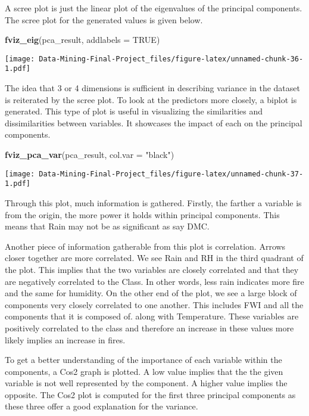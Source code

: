 \documentclass[
]{article}
\newenvironment{Shaded}{\begin{snugshade}}{\end{snugshade}}
\newcommand{\AttributeTok}[1]{\textcolor[rgb]{0.13,0.29,0.53}{#1}}
\newcommand{\ConstantTok}[1]{\textcolor[rgb]{0.56,0.35,0.01}{#1}}
\newcommand{\FunctionTok}[1]{\textcolor[rgb]{0.13,0.29,0.53}{\textbf{#1}}}
\newcommand{\NormalTok}[1]{#1}
\newcommand{\StringTok}[1]{\textcolor[rgb]{0.31,0.60,0.02}{#1}}
\begin{document}
A scree plot is just the linear plot of the eigenvalues of the principal
components. The scree plot for the generated values is given below.

\begin{Shaded}
\begin{Highlighting}[]
\FunctionTok{fviz\_eig}\NormalTok{(pca\_result, }\AttributeTok{addlabels =} \ConstantTok{TRUE}\NormalTok{)}
\end{Highlighting}
\end{Shaded}

\texttt{[image: Data-Mining-Final-Project\_files/figure-latex/unnamed-chunk-36-1.pdf]}

The idea that 3 or 4 dimensions is sufficient in describing variance in
the dataset is reiterated by the scree plot. To look at the predictors
more closely, a biplot is generated. This type of plot is useful in
visualizing the similarities and dissimilarities between variables. It
showcases the impact of each on the principal components.

\begin{Shaded}
\begin{Highlighting}[]
\FunctionTok{fviz\_pca\_var}\NormalTok{(pca\_result, }\AttributeTok{col.var =} \StringTok{"black"}\NormalTok{)}
\end{Highlighting}
\end{Shaded}

\texttt{[image: Data-Mining-Final-Project\_files/figure-latex/unnamed-chunk-37-1.pdf]}

Through this plot, much information is gathered. Firstly, the farther a
variable is from the origin, the more power it holds within principal
components. This means that Rain may not be as significant as say DMC.

Another piece of information gatherable from this plot is correlation.
Arrows closer together are more correlated. We see Rain and RH in the
third quadrant of the plot. This implies that the two variables are
closely correlated and that they are negatively correlated to the Class.
In other words, less rain indicates more fire and the same for humidity.
On the other end of the plot, we see a large block of components very
closely correlated to one another. This includes FWI and all the
components that it is composed of. along with Temperature. These
variables are positively correlated to the class and therefore an
increase in these values more likely implies an increase in fires.

To get a better understanding of the importance of each variable within
the components, a Cos2 graph is plotted. A low value implies that the
the given variable is not well represented by the component. A higher
value implies the opposite. The Cos2 plot is computed for the first
three principal components as these three offer a good explanation for
the variance.
\end{document}
